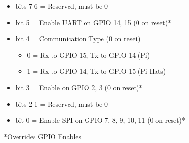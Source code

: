 \begin{itemize}
\item bits 7-6 = Reserved, must be 0
\item bit 5 = Enable UART on GPIO 14, 15 (0 on reset)*
\item bit 4 = Communication Type (0 on reset)
  \begin{itemize}
  \item 0 = Rx to GPIO 15, Tx to GPIO 14 (Pi)
  \item 1 = Rx to GPIO 14, Tx to GPIO 15 (Pi Hats)
  \end{itemize}
\item bit 3 = Enable \iic on GPIO 2, 3 (0 on reset)*
\item bits 2-1 = Reserved, must be 0
\item bit 0 = Enable SPI on GPIO 7, 8, 9, 10, 11 (0 on reset)*
\end{itemize}
*Overrides GPIO Enables

